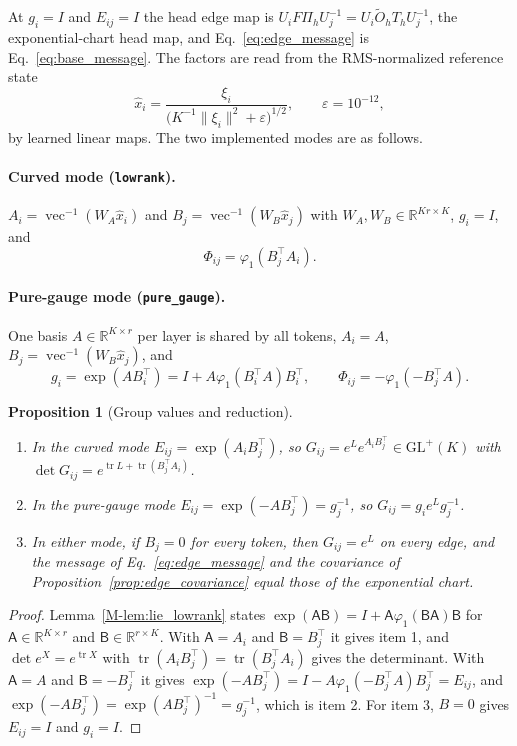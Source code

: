 \documentclass[11pt]{article}
\newtheorem{proposition}[theorem]{Proposition}
\theoremstyle{definition}
\theoremstyle{remark}
\providecommand{\GL}{\mathrm{GL}}
\providecommand{\tr}{\operatorname{tr}}
\providecommand{\cfg}[1]{{\small\texttt{#1}}}
\newcommand{\R}{\mathbb R}
\newcommand{\Ot}{\widetilde O}
\newcommand{\xh}{\hat x}
\newcommand{\Mref}[1]{\ref{M-#1}}
\begin{document}
At $g_i=I$ and $E_{ij}=I$ the head edge map is $U_iF\Pi_hU_j^{-1}=U_i\Ot_hT_hU_j^{-1}$, the exponential-chart head map, and Eq.~\eqref{eq:edge_message} is Eq.~\eqref{eq:base_message}. The factors are read from the RMS-normalized reference state
\begin{equation}
\xh_i=\frac{\xi_i}{\bigl(K^{-1}\|\xi_i\|^2+\varepsilon\bigr)^{1/2}},\qquad\varepsilon=10^{-12},
\label{eq:rms}
\end{equation}
by learned linear maps. The two implemented modes are as follows.

\paragraph{Curved mode (\cfg{lowrank}).}
$A_i=\operatorname{vec}^{-1}(W_A\xh_i)$ and $B_j=\operatorname{vec}^{-1}(W_B\xh_j)$ with $W_A,W_B\in\R^{Kr\times K}$, $g_i=I$, and
\begin{equation}
\Phi_{ij}=\varphi_1(B_j^\top A_i).
\label{eq:lowrank_phi}
\end{equation}

\paragraph{Pure-gauge mode (\cfg{pure\_gauge}).}
One basis $A\in\R^{K\times r}$ per layer is shared by all tokens, $A_i=A$, $B_j=\operatorname{vec}^{-1}(W_B\xh_j)$, and
\begin{equation}
g_i=\exp(AB_i^\top)=I+A\varphi_1(B_i^\top A)B_i^\top,\qquad \Phi_{ij}=-\varphi_1(-B_j^\top A).
\label{eq:pure_gauge}
\end{equation}

\begin{proposition}[Group values and reduction]
\label{prop:group_values}
\begin{enumerate}
\item In the curved mode $E_{ij}=\exp(A_iB_j^\top)$, so $G_{ij}=e^{L}e^{A_iB_j^\top}\in\GL^+(K)$ with $\det G_{ij}=e^{\tr L+\tr(B_j^\top A_i)}$.
\item In the pure-gauge mode $E_{ij}=\exp(-AB_j^\top)=g_j^{-1}$, so $G_{ij}=g_ie^{L}g_j^{-1}$.
\item In either mode, if $B_j=0$ for every token, then $G_{ij}=e^{L}$ on every edge, and the message of Eq.~\eqref{eq:edge_message} and the covariance of Proposition~\ref{prop:edge_covariance} equal those of the exponential chart.
\end{enumerate}
\end{proposition}
\begin{proof}
Lemma~\Mref{lem:lie_lowrank} states $\exp(\mathsf A\mathsf B)=I+\mathsf A\varphi_1(\mathsf B\mathsf A)\mathsf B$ for $\mathsf A\in\R^{K\times r}$ and $\mathsf B\in\R^{r\times K}$. With $\mathsf A=A_i$ and $\mathsf B=B_j^\top$ it gives item 1, and $\det e^X=e^{\tr X}$ with $\tr(A_iB_j^\top)=\tr(B_j^\top A_i)$ gives the determinant. With $\mathsf A=A$ and $\mathsf B=-B_j^\top$ it gives $\exp(-AB_j^\top)=I-A\varphi_1(-B_j^\top A)B_j^\top=E_{ij}$, and $\exp(-AB_j^\top)=\exp(AB_j^\top)^{-1}=g_j^{-1}$, which is item 2. For item 3, $B=0$ gives $E_{ij}=I$ and $g_i=I$.
\end{proof}
\end{document}
